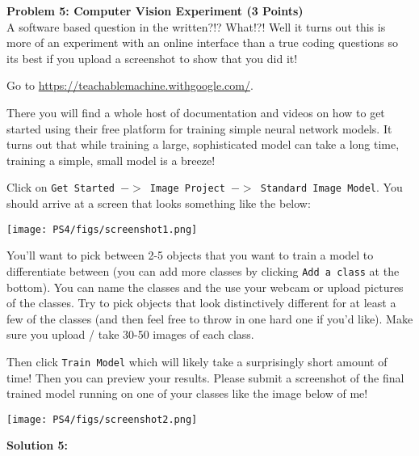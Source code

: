 \documentclass[]{article}
\begin{document}
\clearpage
\textbf{Problem 5: Computer Vision Experiment (3 Points)}\\

A software based question in the written?!? What!?! Well it turns out this is more of an experiment with an online interface than a true coding questions so its best if you upload a screenshot to show that you did it!

Go to \url{https://teachablemachine.withgoogle.com/}. 

There you will find a whole host of documentation and videos on how to get started using their free platform for training simple neural network models. It turns out that while training a large, sophisticated model can take a long time, training a simple, small model is a breeze!

Click on \texttt{Get Started $->$ Image Project $->$ Standard Image Model}. You should arrive at a screen that looks something like the below:

\begin{center}
    \texttt{[image: PS4/figs/screenshot1.png]}    
\end{center}

You'll want to pick between 2-5 objects that you want to train a model to differentiate between (you can add more classes by clicking \texttt{Add a class} at the bottom). You can name the classes and the use your webcam or upload pictures of the classes. Try to pick objects that look distinctively different for at least a few of the classes (and then feel free to throw in one hard one if you'd like). Make sure you upload / take 30-50 images of each class.

Then click \texttt{Train Model} which will likely take a surprisingly short amount of time! Then you can preview your results. Please submit a screenshot of the final trained model running on one of your classes like the image below of me!

\begin{center}
    \texttt{[image: PS4/figs/screenshot2.png]}    
\end{center}

\textbf{Solution 5:}
\end{document}
